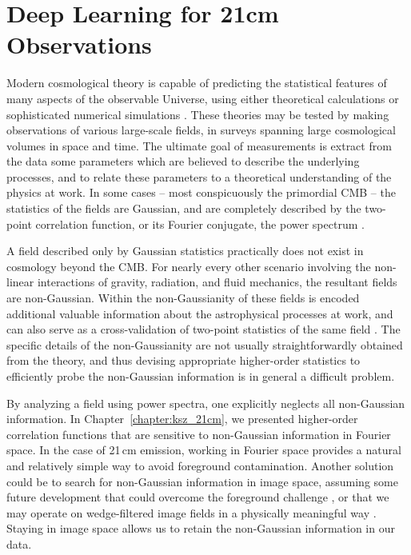 \chapter{Deep Learning for 21cm Observations}
\label{chapter:hera_ml}

Modern cosmological theory is capable of predicting the statistical features of many aspects of the observable Universe, using either theoretical calculations \citep[e.g.][]{Bond.91, Sheth.99} or sophisticated numerical simulations \citep[e.g.][]{Lewis.00, Vogelsberger.14}. These theories may be tested by making observations of various large-scale fields, in surveys spanning large cosmological volumes in space and time. The ultimate goal of measurements is extract from the data some parameters which are believed to describe the underlying processes, and to relate these parameters to a theoretical understanding of the physics at work. In some cases -- most conspicuously the primordial CMB -- the statistics of the fields are Gaussian, and are completely described by the two-point correlation function, or its Fourier conjugate, the power spectrum \citep[e.g.][for a review]{Liddle.00}.

A field described only by Gaussian statistics practically does not exist in cosmology beyond the CMB. For nearly every other scenario involving the non-linear interactions of gravity, radiation, and fluid mechanics, the resultant fields are non-Gaussian. Within the non-Gaussianity of these fields is encoded additional valuable information about the astrophysical processes at work, and can also serve as a cross-validation of two-point statistics of the same field \citep{Alvarez.16, Majumdar.17}. The specific details of the non-Gaussianity are not usually straightforwardly obtained from the theory, and thus devising appropriate higher-order statistics to efficiently probe the non-Gaussian information is in general a difficult problem. 

By analyzing a field using power spectra, one explicitly neglects all non-Gaussian information. In Chapter~\ref{chapter:ksz_21cm}, we presented higher-order correlation functions that are sensitive to non-Gaussian information in Fourier space. In the case of 21\,cm emission, working in Fourier space provides a natural and relatively simple way to avoid foreground contamination. Another solution could be to search for non-Gaussian information in image space, assuming some future development that could overcome the foreground challenge \citep[e.g.][]{Shaw.14, Shaw.15, Zhu.16, Patil.17}, or that we may operate on wedge-filtered image fields in a physically meaningful way \citep{Beardsley.15}. Staying in image space allows us to retain the non-Gaussian information in our data.

